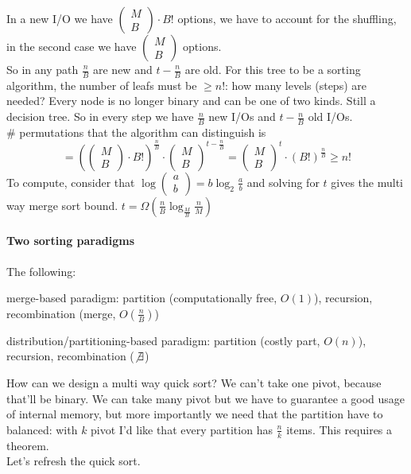 \documentclass[10pt]{report}
\begin{document}
In a new I/O we have $\left(\begin{array}{c}
M\\B
\end{array}\right)\cdot B!$ options, we have to account for the shuffling, in the second case we have $\left(\begin{array}{c}
M\\B
\end{array}\right)$ options.\\
So in any path $\frac{n}{B}$ are new and $t - \frac{n}{B}$ are old. For this tree to be a sorting algorithm, the number of leafs must be $\geq n!$: how many levels (steps) are needed? Every node is no longer binary and can be one of two kinds. Still a decision tree. So in every step we have $\frac{n}{B}$ new I/Os and $t - \frac{n}{B}$ old I/Os.\\
\# permutations that the algorithm can distinguish is $$= \left( \left(\begin{array}{c}
M\\B
\end{array}\right)\cdot B!\right)^{\frac{n}{B}}\cdot \left(\begin{array}{c}
M\\B
\end{array}\right)^{t - \frac{n}{B}} = \left(\begin{array}{c}
M\\B
\end{array}\right)^{t}\cdot \left(B!\right)^{\frac{n}{B}} \geq n!$$
To compute, consider that $\log\left(\begin{array}{c}
a\\b
\end{array}\right) = b\log_2 \frac{a}{b}$ and solving for $t$ gives the multi way merge sort bound. $t = \Omega(\frac{n}{B}\log_{\frac{M}{B}} \frac{n}{M})$
\paragraph{Two sorting paradigms} The following:
\begin{list}{}{}
	\item merge-based paradigm: partition (computationally free, $O(1)$), recursion, recombination (merge, $O(\frac{n}{B})$)
	\item distribution/partitioning-based paradigm: partition (costly part, $O(n)$), recursion, recombination ($\not\exists$)
\end{list}
How can we design a multi way quick sort? We can't take one pivot, because that'll be binary. We can take many pivot but we have to guarantee a good usage of internal memory, but more importantly we need that the partition have to balanced: with $k$ pivot I'd like that every partition has $\frac{n}{k}$ items. This requires a theorem.\\
Let's refresh the quick sort. %
\end{document}
